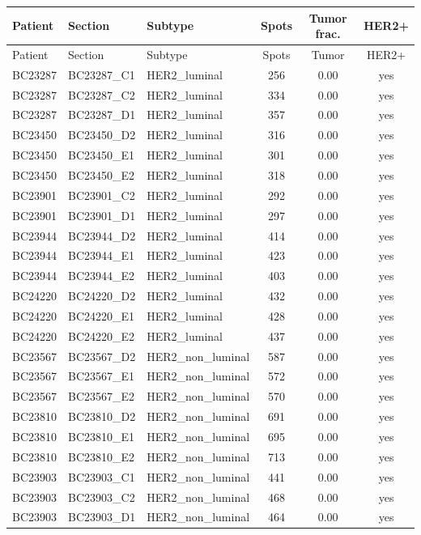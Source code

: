 \begin{longtable}{lllccc}\toprule
Patient & Section & Subtype & Spots & Tumor frac. & HER2+ \\
\midrule
\endfirsthead
\toprule Patient & Section & Subtype & Spots & Tumor & HER2+ \\ \midrule \endhead
BC23287 & BC23287\_C1 & HER2\_luminal & 256 & 0.00 & yes \\
BC23287 & BC23287\_C2 & HER2\_luminal & 334 & 0.00 & yes \\
BC23287 & BC23287\_D1 & HER2\_luminal & 357 & 0.00 & yes \\
BC23450 & BC23450\_D2 & HER2\_luminal & 316 & 0.00 & yes \\
BC23450 & BC23450\_E1 & HER2\_luminal & 301 & 0.00 & yes \\
BC23450 & BC23450\_E2 & HER2\_luminal & 318 & 0.00 & yes \\
BC23901 & BC23901\_C2 & HER2\_luminal & 292 & 0.00 & yes \\
BC23901 & BC23901\_D1 & HER2\_luminal & 297 & 0.00 & yes \\
BC23944 & BC23944\_D2 & HER2\_luminal & 414 & 0.00 & yes \\
BC23944 & BC23944\_E1 & HER2\_luminal & 423 & 0.00 & yes \\
BC23944 & BC23944\_E2 & HER2\_luminal & 403 & 0.00 & yes \\
BC24220 & BC24220\_D2 & HER2\_luminal & 432 & 0.00 & yes \\
BC24220 & BC24220\_E1 & HER2\_luminal & 428 & 0.00 & yes \\
BC24220 & BC24220\_E2 & HER2\_luminal & 437 & 0.00 & yes \\
BC23567 & BC23567\_D2 & HER2\_non\_luminal & 587 & 0.00 & yes \\
BC23567 & BC23567\_E1 & HER2\_non\_luminal & 572 & 0.00 & yes \\
BC23567 & BC23567\_E2 & HER2\_non\_luminal & 570 & 0.00 & yes \\
BC23810 & BC23810\_D2 & HER2\_non\_luminal & 691 & 0.00 & yes \\
BC23810 & BC23810\_E1 & HER2\_non\_luminal & 695 & 0.00 & yes \\
BC23810 & BC23810\_E2 & HER2\_non\_luminal & 713 & 0.00 & yes \\
BC23903 & BC23903\_C1 & HER2\_non\_luminal & 441 & 0.00 & yes \\
BC23903 & BC23903\_C2 & HER2\_non\_luminal & 468 & 0.00 & yes \\
BC23903 & BC23903\_D1 & HER2\_non\_luminal & 464 & 0.00 & yes \\

\end{longtable}
